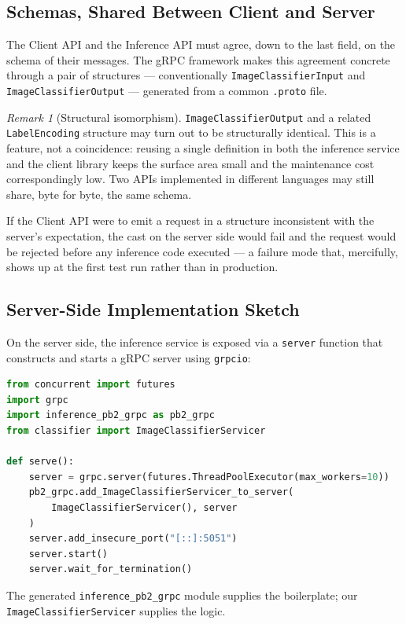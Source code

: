 \documentclass[11pt,a4paper]{article}
\theoremstyle{definition}
\theoremstyle{remark}
\newtheorem*{remark}{Remark}
\begin{document}
\subsection{Schemas, Shared Between Client and Server}

The Client API and the Inference API must agree, down to the last field, on the schema of their messages. The gRPC framework makes this agreement concrete through a pair of structures --- conventionally \texttt{ImageClassifierInput} and \texttt{ImageClassifierOutput} --- generated from a common \texttt{.proto} file.

\begin{remark}[Structural isomorphism]
\texttt{ImageClassifierOutput} and a related \texttt{LabelEncoding} structure may turn out to be structurally identical. This is a feature, not a coincidence: reusing a single definition in both the inference service and the client library keeps the surface area small and the maintenance cost correspondingly low. Two APIs implemented in different languages may still share, byte for byte, the same schema.
\end{remark}

If the Client API were to emit a request in a structure inconsistent with the server's expectation, the cast on the server side would fail and the request would be rejected before any inference code executed --- a failure mode that, mercifully, shows up at the first test run rather than in production.

\subsection{Server-Side Implementation Sketch}

On the server side, the inference service is exposed via a \texttt{server} function that constructs and starts a gRPC server using \texttt{grpcio}:

\begin{lstlisting}[language=Python]
from concurrent import futures
import grpc
import inference_pb2_grpc as pb2_grpc
from classifier import ImageClassifierServicer

def serve():
    server = grpc.server(futures.ThreadPoolExecutor(max_workers=10))
    pb2_grpc.add_ImageClassifierServicer_to_server(
        ImageClassifierServicer(), server
    )
    server.add_insecure_port("[::]:5051")
    server.start()
    server.wait_for_termination()
\end{lstlisting}

The generated \texttt{inference\_pb2\_grpc} module supplies the boilerplate; our \texttt{ImageClassifierServicer} supplies the logic.
\end{document}
